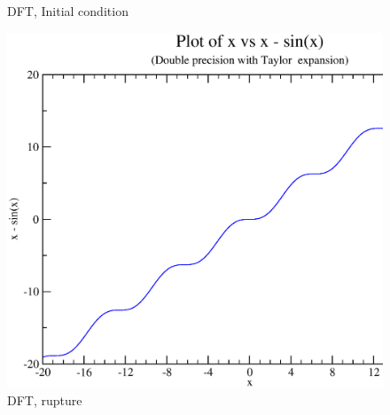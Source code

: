 \documentclass{article}
\begin{document}
\begin{figure}[ht]
\begin{minipage}[b]{0.5\linewidth}
    \caption{DFT, Initial condition} 
    \vspace{4ex}
  \end{minipage}%
  \begin{minipage}[b]{0.5\linewidth}
    \centering
    \includegraphics[width=.5\linewidth]{images/d.eps} 
    \caption{DFT, rupture} 
    \vspace{4ex}
  \end{minipage} 
\end{figure}
\end{document}
